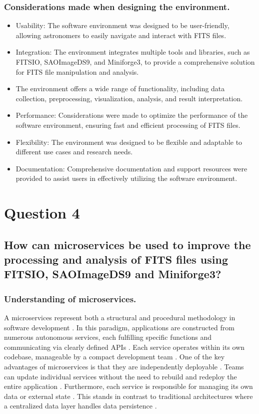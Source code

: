 \documentclass[a4paper,oneside,11pt]{book}
\begin{document}
\subsection{Considerations made when designing the environment.}
\begin{itemize}
    \item Usability: The software environment was designed to be user-friendly, allowing astronomers to easily navigate and interact with FITS files.
    \item Integration: The environment integrates multiple tools and libraries, such as FITSIO, SAOImageDS9, and Miniforge3, to provide a comprehensive solution for FITS file manipulation and analysis.
    \item The environment offers a wide range of functionality, including data collection, preprocessing, visualization, analysis, and result interpretation. 
    \item Performance: Considerations were made to optimize the performance of the software environment, ensuring fast and efficient processing of FITS files. 
    \item Flexibility: The environment was designed to be flexible and adaptable to different use cases and research needs. 
    \item Documentation: Comprehensive documentation and support resources were provided to assist users in effectively utilizing the software environment.
\end{itemize}
\chapter{Question 4}
\section{How can microservices be used to improve the processing and analysis of FITS files using FITSIO, SAOImageDS9 and Miniforge3?}
\subsection{Understanding of microservices.}

A microservices represent both a structural and procedural methodology in software development \citep{microservices}. In this paradigm, applications are constructed from numerous autonomous services, each fulfilling specific functions and communicating via clearly defined APIs \citep{microservices}. Each service operates within its own codebase, manageable by a compact development team \citep{ozkaya2021microservices}. One of the key advantages of microservices is that they are independently deployable \citep{ozkaya2021microservices}. Teams can update individual services without the need to rebuild and redeploy the entire application \citep{ozkaya2021microservices}. Furthermore, each service is responsible for managing its own data or external state \citep{ozkaya2021microservices}. This stands in contrast to traditional architectures where a centralized data layer handles data persistence \citep{ozkaya2021microservices}.
\noindent
\end{document}
